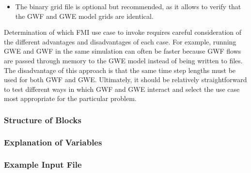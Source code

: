 \begin{itemize}
\begin{itemize}
\item The binary grid file is optional but recommended, as it allows \mf to verify that the GWF and GWE model grids are identical.
\end{itemize}

\end{itemize}

\noindent Determination of which FMI use case to invoke requires careful consideration of the different advantages and disadvantages of each case.  For example, running GWE and GWF in the same simulation can often be faster because GWF flows are passed through memory to the GWE model instead of being written to files.  The disadvantage of this approach is that the same time step lengths must be used for both GWF and GWE.  Ultimately, it should be relatively straightforward to test different ways in which GWF and GWE interact and select the use case most appropriate for the particular problem. 

\vspace{5mm}
\subsubsection{Structure of Blocks}



\vspace{5mm}
\subsubsection{Explanation of Variables}
\begin{description}

\end{description}

\vspace{5mm}
\subsubsection{Example Input File}


